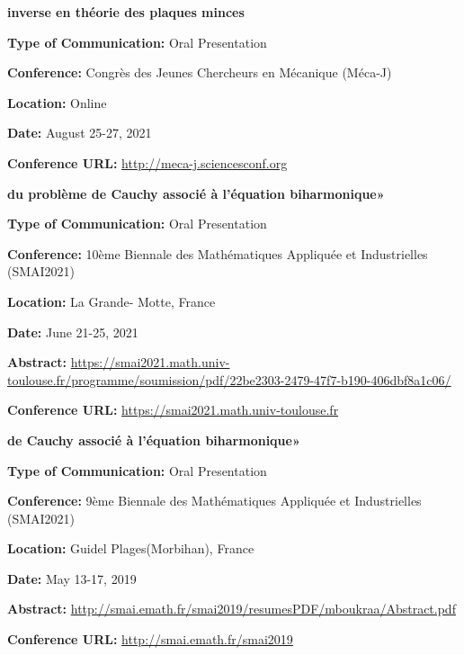 \documentclass[10pt]{article} %
\begin{document}
{\vspace{-0.13cm}\textbf{inverse en théorie des plaques minces}
	
	\textbf{Type of Communication:} Oral Presentation
	
	\textbf{Conference:} Congrès des Jeunes Chercheurs en Mécanique (Méca-J)
	
	\textbf{Location:} Online
	
	\textbf{Date:} August 25-27,  2021 
	
	\textbf{Conference URL:} \href{http://meca-j.sciencesconf.org}{http://meca-j.sciencesconf.org}
}



{\vspace{-0.13cm}\textbf{du problème de Cauchy associé à l’équation biharmonique»}
	
	\textbf{Type of Communication:} Oral Presentation
	
	\textbf{Conference:} 10ème Biennale des Mathématiques Appliquée et Industrielles (SMAI2021)
	
	\textbf{Location:} La Grande- Motte, France
	
	\textbf{Date:} June 21-25, 2021 
	
	\textbf{Abstract:}
\href{https://smai2021.math.univ-toulouse.fr/programme/soumission/pdf/22be2303-2479-47f7-b190-406dbf8a1c06/
}{https://smai2021.math.univ-toulouse.fr/programme/soumission/pdf/22be2303-2479-47f7-b190-406dbf8a1c06/
}
	
	\textbf{Conference URL:} \href{https://smai2021.math.univ-toulouse.fr}{https://smai2021.math.univ-toulouse.fr}
}


{\vspace{-0.13cm}\textbf{de Cauchy associé à l'équation biharmonique»}
	
	\textbf{Type of Communication:} Oral Presentation
	
	\textbf{Conference:} 9ème Biennale des Mathématiques Appliquée et Industrielles (SMAI2021)
	
	\textbf{Location:} Guidel Plages(Morbihan), France
	
	\textbf{Date:} May 13-17, 2019 
	
	\textbf{Abstract:}
\href{http://smai.emath.fr/smai2019/resumesPDF/mboukraa/Abstract.pdf
}{http://smai.emath.fr/smai2019/resumesPDF/mboukraa/Abstract.pdf}
	
	\textbf{Conference URL:} \href{http://smai.emath.fr/smai2019/index.php}{http://smai.emath.fr/smai2019}
}
\end{document}
